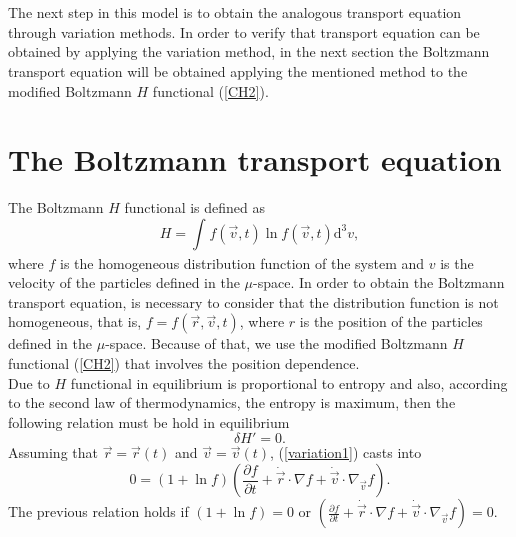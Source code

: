 \documentclass{article}
\begin{document}
\\
\\
The next step in this model is to obtain the analogous transport equation through variation methods. In order to verify that transport equation can be obtained by applying the variation method, in the next section the Boltzmann transport equation will be obtained applying the mentioned method to the modified Boltzmann $H$ functional (\ref{CH2}).

\section{The Boltzmann transport equation}
The Boltzmann $H$ functional is defined as
\begin{equation}
    H=\int_{}^{}f(\vec{v},t)\ln f(\vec{v},t)\mathrm{d}^{3}v,
\end{equation}
where $f$ is the homogeneous distribution function of the system and $v$ is the velocity of the particles defined in the $\mu$-space. In order to obtain the Boltzmann transport equation, is necessary to consider that the distribution function is not homogeneous, that is, $f=f(\vec{r},\vec{v},t)$, where $r$ is the position of the particles defined in the $\mu$-space. Because of that, we use the modified Boltzmann $H$ functional (\ref{CH2})
that involves the position dependence. %
\\
Due to $H$ functional in equilibrium is proportional to entropy and also, according to the second law of thermodynamics, the entropy is maximum, then the following relation must be hold in equilibrium
\begin{equation}
    \delta H'=0.\label{variation1}
\end{equation}
Assuming that $\vec{r}=\vec{r}(t)$ and $\vec{v}=\vec{v}(t)$, (\ref{variation1}) casts into
\begin{equation}
    0=\left( 1+\ln f \right)\left( \frac{\partial f}{\partial t}+\dot{\vec{r}}\cdot \nabla f+\dot{\vec{v}}\cdot \nabla_{\vec{v}} f \right).
\end{equation}
The previous relation holds if $(1+\ln f)=0$ or $(\frac{\partial f}{\partial t}+\dot{\vec{r}}\cdot \nabla f+\dot{\vec{v}}\cdot \nabla_{\vec{v}} f)=0$.\\
\end{document}
